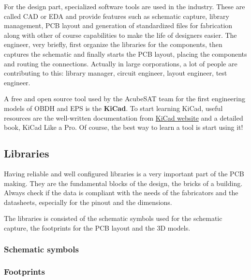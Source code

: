 \documentclass[final]{cubedoc}
\begin{document}
	For the design part, specialized software tools are used in the industry. These are called CAD or EDA and provide features such as schematic capture, library management, PCB layout and generation of standardized files for fabrication along with other of course capabilities to make the life of designers easier. The engineer, very briefly, first organize the libraries for the components, then captures the schematic and finally starts the PCB layout, placing the components and routing the connections. Actually in large corporations, a lot of people are contributing to this: library manager, circuit engineer, layout engineer, test engineer.
	
	A free and open source tool used by the AcubeSAT team for the first engineering models of OBDH and EPS is the \textbf{KiCad}. To start learning KiCad, useful resources are the well-written documentation from \href{http://docs.kicad-pcb.org/}{KiCad website} and a detailed book, KiCad Like a Pro. Of course, the best way to learn a tool is start using it!
	
	\subsection{Libraries}
	
	Having reliable and well configured libraries is a very important part of the PCB making. They are the fundamental blocks of the design, the bricks of a building. Always check if the data is compliant with the needs of the fabricators and the datasheets, especially for the pinout and the dimensions.
	
	The libraries is consisted of the schematic symbols used for the schematic capture, the footprints for the PCB layout and the 3D models.
	
	\subsubsection{Schematic symbols}
	
	\subsubsection{Footprints}
	
\end{document}
